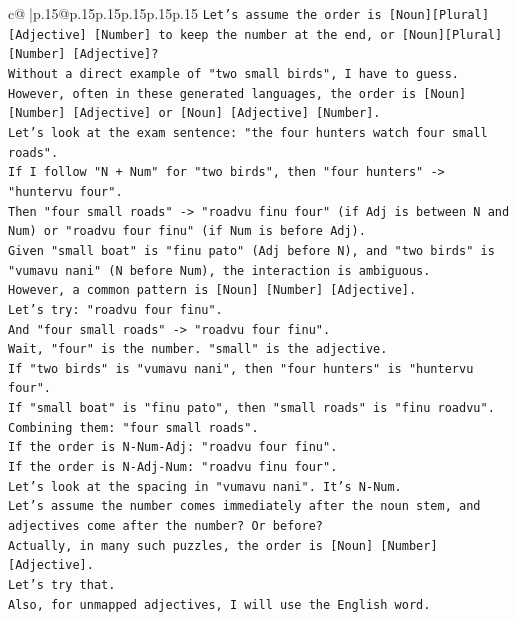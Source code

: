 \documentclass{article}
\begin{document}
{\begin{supertabular}{c@{$\;$}|p{.15\linewidth}@{}p{.15\linewidth}p{.15\linewidth}p{.15\linewidth}p{.15\linewidth}p{.15\linewidth}}
{{{\texttt{Let's assume the order is {[}Noun{]}{[}Plural{]} {[}Adjective{]} {[}Number{]} to keep the number at the end, or {[}Noun{]}{[}Plural{]} {[}Number{]} {[}Adjective{]}?} \\
\texttt{Without a direct example of "two small birds", I have to guess.} \\
\texttt{However, often in these generated languages, the order is {[}Noun{]} {[}Number{]} {[}Adjective{]} or {[}Noun{]} {[}Adjective{]} {[}Number{]}.} \\
\texttt{Let's look at the exam sentence: "the four hunters watch four small roads".} \\
\texttt{If I follow "N + Num" for "two birds", then "four hunters" {-}> "huntervu four".} \\
\texttt{Then "four small roads" {-}> "roadvu finu four" (if Adj is between N and Num) or "roadvu four finu" (if Num is before Adj).} \\
\texttt{Given "small boat" is "finu pato" (Adj before N), and "two birds" is "vumavu nani" (N before Num), the interaction is ambiguous.} \\
\texttt{However, a common pattern is {[}Noun{]} {[}Number{]} {[}Adjective{]}.} \\
\texttt{Let's try: "roadvu four finu".} \\
\texttt{And "four small roads" {-}> "roadvu four finu".} \\
\texttt{Wait, "four" is the number. "small" is the adjective.} \\
\texttt{If "two birds" is "vumavu nani", then "four hunters" is "huntervu four".} \\
\texttt{If "small boat" is "finu pato", then "small roads" is "finu roadvu".} \\
\texttt{Combining them: "four small roads".} \\
\texttt{If the order is N{-}Num{-}Adj: "roadvu four finu".} \\
\texttt{If the order is N{-}Adj{-}Num: "roadvu finu four".} \\
\texttt{Let's look at the spacing in "vumavu nani". It's N{-}Num.} \\
\texttt{Let's assume the number comes immediately after the noun stem, and adjectives come after the number? Or before?} \\
\texttt{Actually, in many such puzzles, the order is {[}Noun{]} {[}Number{]} {[}Adjective{]}.} \\
\texttt{Let's try that.} \\
\texttt{Also, for unmapped adjectives, I will use the English word.} \\
}}}
\end{supertabular}}
\end{document}
